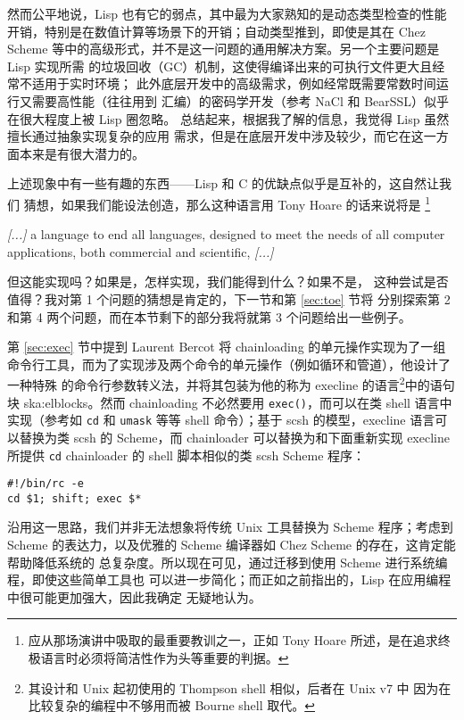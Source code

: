 然而公平地说，Lisp 也有它的弱点，其中最为大家熟知的是动态类型检查的性能
开销，特别是在数值计算等场景下的开销；自动类型推到，即使是其在 Chez Scheme
等中的高级形式，并不是这一问题的通用解决方案。另一个主要问题是 Lisp 实现所需
的垃圾回收（GC）机制，这使得编译出来的可执行文件更大且经常不适用于实时环境；
此外底层开发中的高级需求，例如经常既需要常数时间运行又需要高性能（往往用到
汇编）的密码学开发（参考 NaCl 和 BearSSL）似乎在很大程度上被 Lisp 圈忽略。
总结起来，根据我了解的信息，我觉得 Lisp 虽然擅长通过抽象实现复杂的应用
需求，但是在底层开发中涉及较少，而它在这一方面本来是有很大潜力的。

上述现象中有一些有趣的东西——Lisp 和 C 的优缺点似乎是互补的，这自然让我们
猜想，如果我们能设法创造，那么这种语言用 Tony Hoare 的话来说将是%
\footnote{应从那场演讲中吸取的最重要教训之一，正如 Tony Hoare
所述，是在追求终极语言时必须将简洁性作为头等重要的判据。}
\begin{quoting}
	\emph{[...]} a language to end all languages, designed to meet the needs
	of all computer applications, both commercial and scientific, \emph{[...]}
\end{quoting}
但这能实现吗？如果是，怎样实现，我们能得到什么？如果不是，
这种尝试是否值得？我对第 1 个问题的猜想是肯定的，下一节和第 \ref{sec:toe} 节将
分别探索第 2 和第 4 两个问题，而在本节剩下的部分我将就第 3 个问题给出一些例子。

第 \ref{sec:exec} 节中提到 Laurent Bercot 将 chainloading 的单元操作实现为了一组
命令行工具，而为了实现涉及两个命令的单元操作（例如循环和管道），他设计了一种特殊
的命令行参数转义法，并将其包装为他的称为 execline 的语言\footnote{其设计和 Unix
起初使用的 Thompson shell 相似，后者在 Unix v7 中
因为在比较复杂的编程中不够用而被 Bourne shell 取代。}中的语句块\cupercite%
{ska:elblocks}。然而 chainloading 不必然要用 \verb|exec()|，而可以在类 shell
语言中实现（参考如 \verb|cd| 和 \verb|umask| 等等 shell
命令）；基于 scsh 的模型，execline 语言可以替换为类 scsh
的 Scheme，而 chainloader 可以替换为和下面重新实现 execline 所提供 \verb|cd|
chainloader 的 shell 脚本相似的类 scsh Scheme 程序：
\begin{quoting}
\begin{Verbatim}
#!/bin/rc -e
cd $1; shift; exec $*
\end{Verbatim}
\end{quoting}

沿用这一思路，我们并非无法想象将传统 Unix 工具替换为 Scheme 程序；考虑到 Scheme
的表达力，以及优雅的 Scheme 编译器如 Chez Scheme 的存在，这肯定能帮助降低系统的
总复杂度。所以现在可见，通过迁移到使用 Scheme 进行系统编程，即使这些简单工具也
可以进一步简化；而正如之前指出的，Lisp 在应用编程中很可能更加强大，因此我确定
无疑地认为。

